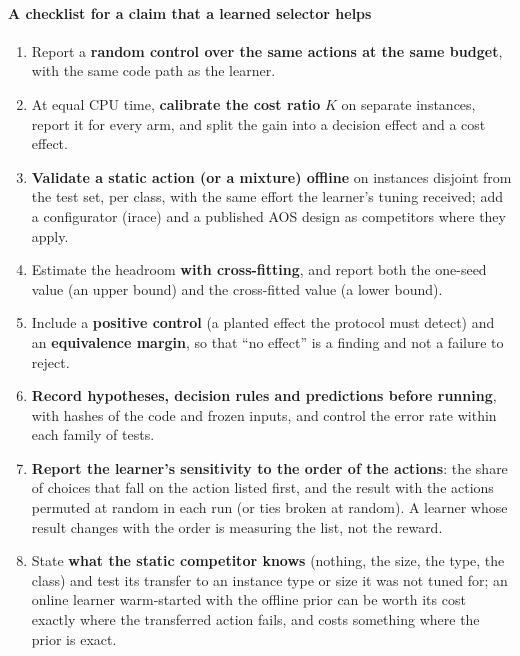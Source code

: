 \paragraph{A checklist for a claim that a learned selector helps}
\begin{enumerate}
\item Report a \textbf{random control over the same actions at the same budget}, with the same code path as the learner.
\item At equal CPU time, \textbf{calibrate the cost ratio} $K$ on separate instances, report it for every arm, and split the gain into a decision effect and a cost effect.
\item \textbf{Validate a static action (or a mixture) offline} on instances disjoint from the test set, per class, with the same effort the learner's tuning received; add a configurator (irace) and a published AOS design as competitors where they apply.
\item Estimate the headroom \textbf{with cross-fitting}, and report both the one-seed value (an upper bound) and the cross-fitted value (a lower bound).
\item Include a \textbf{positive control} (a planted effect the protocol must detect) and an \textbf{equivalence margin}, so that ``no effect'' is a finding and not a failure to reject.
\item \textbf{Record hypotheses, decision rules and predictions before running}, with hashes of the code and frozen inputs, and control the error rate within each family of tests.
\item \textbf{Report the learner's sensitivity to the order of the actions}: the share of choices that fall on the action listed first, and the result with the actions permuted at random in each run (or ties broken at random). A learner whose result changes with the order is measuring the list, not the reward.
\item State \textbf{what the static competitor knows} (nothing, the size, the type, the class) and test its transfer to an instance type or size it was not tuned for; an online learner warm-started with the offline prior can be worth its cost exactly where the transferred action fails, and costs something where the prior is exact.
\end{enumerate}

